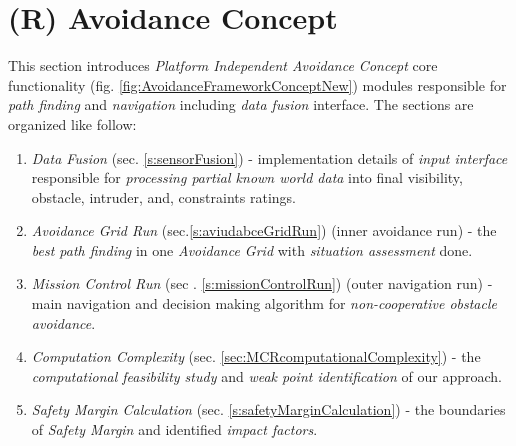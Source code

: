 \section{(R) Avoidance Concept}\label{s:avoidanceConcept}
This section introduces \emph{Platform Independent Avoidance Concept} core functionality (fig. \ref{fig:AvoidanceFrameworkConceptNew}) modules responsible for \emph{path finding} and \emph{navigation} including \emph{data fusion} interface. The sections are organized like follow:

\begin{enumerate}
    \item \emph{Data Fusion} (sec. \ref{s:sensorFusion}) - implementation details of \emph{input interface} responsible for \emph{processing partial known world data} into final visibility, obstacle, intruder, and, constraints ratings.
    
    \item \emph{Avoidance Grid Run} (sec.\ref{s:aviudabceGridRun}) (inner avoidance run) - the \emph{best path finding} in one \emph{Avoidance Grid} with \emph{situation assessment} done.
    
    \item \emph{Mission Control Run} (sec . \ref{s:missionControlRun}) (outer navigation run) - main navigation and decision making algorithm for \emph{non-cooperative obstacle avoidance}.
    
    \item \emph{Computation Complexity} (sec. \ref{sec:MCRcomputationalComplexity}) - the \emph{computational feasibility study} and \emph{weak point identification} of our approach.
    
    \item \emph{Safety Margin Calculation} (sec. \ref{s:safetyMarginCalculation}) - the boundaries of \emph{Safety Margin} and identified \emph{impact factors}.
\end{enumerate}
